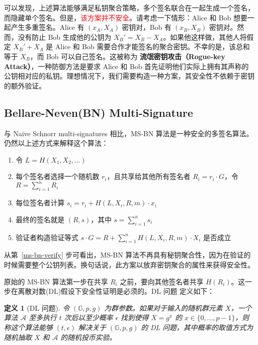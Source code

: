 \documentclass[a4paper,10pt]{article}
\newtheorem{definition}{\bf 定义}[section]
\begin{document}
可以发现，上述算法能够满足私钥聚合策略，多个签名联合在一起生成一个签名，而隐藏单个签名。但是，\textcolor{red}{该方案并不安全}。请考虑一下情形：Alice 和 Bob 想要一起产生多重签名。Alice 有
\((x_A,X_A)\) 密钥对，Bob 有 \((x_B,X_B)\) 密钥对。然而，没有防止 Bob 生成他的公钥为 \(X_B'=X_B-X_A\)。如果他这样做，其他人将假定
\(X_B'+X_A\) 是 Alice 和 Bob 需要合作才能签名的聚合密钥。不幸的是，该总和等于 \(X_B\)，而 Bob 可以自己签名。这被称为 \textbf{流氓密钥攻击（Rogue-key
Attack）}，一种防御方法是要求 Alice 和 Bob 首先证明他们实际上拥有其声称的公钥相对应的私钥。理想情况下，我们需要构造一种方案，其安全性不依赖于密钥的额外验证。

\subsection{Bellare-Neven(BN) Multi-Signature}

与 Naive Schnorr multi-signatures 相比，MS-BN \cite{2006Multi} 算法是一种安全的多签名算法。仍然以上述方式来解释这个算法：

\begin{enumerate}
  \item 令 \(L=H(X_1,X_2,\dots)\)
  \item 每个签名者选择一个随机数 \(r_i\)，且共享给其他所有签名者 \(R_i=r_i\cdot G\)，令 \(R=\sum_{i=1}^n R_i\)
  \item 每位签名者计算 \(s_i=r_i+H(L,X_i,R,m)\cdot x_i\)
  \item 最终的签名就是 \((R,s)\)，其中 \(s=\sum_{i=1}^n s_i\)
  \item\label{ms-bn-verify} 验证者构造验证等式 \(s\cdot G=R+\sum_{i=1}^n H(L,X_i,R,m)\cdot X_i\) 是否成立
\end{enumerate}

从第~\ref{ms-bn-verify} 步可看出，MS-BN 算法不再具有秘钥聚合性，因为在验证的时候需要整个公钥列表。换句话说，此方案以放弃密钥聚合的属性来获得安全性。

原始的 MS-BN 算法第一步在共享 \(R_i\) 之前，要向其他签名者共享 \(H(R_i)\)。这一步在离散对数(DL)假设下安全性证明是必须的。DL 问题 \cite{2019Simple} 定义如下：

\begin{definition}[DL 问题]
  令 \((\mathbb{G},p,g)\) 为群参数。如果对于输入的随机群元素 \(X\)，一个算法 \(\mathcal{A}\) 至多执行 \(t\) 次后以至少概率
  \(\epsilon\) 找到使得 \(X=g^x\) 的 \(x\in\{0,\dots,p-1\}\)，则称这个算法能够 \((t,\epsilon)\) 解决关于
  \((\mathbb{G},p,g)\) 的 DL 问题，其中概率的取值方式为随机抽取 \(X\) 和 \(\mathcal{A}\) 的随机投币实验。
\end{definition}
\end{document}
